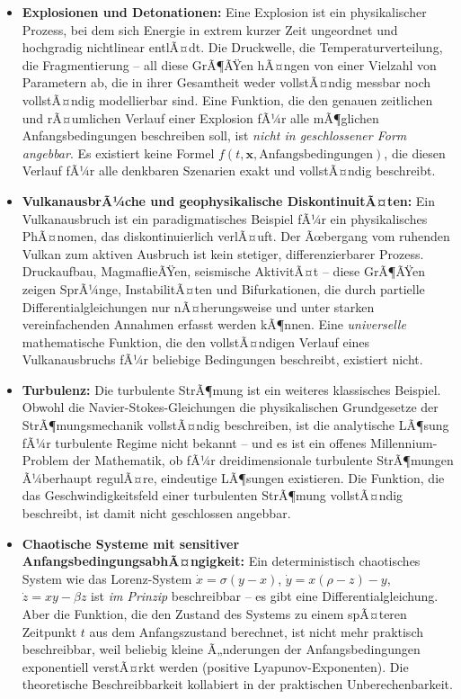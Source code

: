 ﻿\documentclass[12pt, a4paper]{article}
\begin{document}
	\begin{itemize}
		\item \textbf{Explosionen und Detonationen:} Eine Explosion ist ein physikalischer Prozess, bei dem sich Energie in extrem kurzer Zeit ungeordnet und hochgradig nichtlinear entlÃ¤dt. Die Druckwelle, die Temperaturverteilung, die Fragmentierung -- all diese GrÃ¶ÃŸen hÃ¤ngen von einer Vielzahl von Parametern ab, die in ihrer Gesamtheit weder vollstÃ¤ndig messbar noch vollstÃ¤ndig modellierbar sind. Eine Funktion, die den genauen zeitlichen und rÃ¤umlichen Verlauf einer Explosion fÃ¼r alle mÃ¶glichen Anfangsbedingungen beschreiben soll, ist \textit{nicht in geschlossener Form angebbar}. Es existiert keine Formel $f(t, \mathbf{x}, \text{Anfangsbedingungen})$, die diesen Verlauf fÃ¼r alle denkbaren Szenarien exakt und vollstÃ¤ndig beschreibt.
		\item \textbf{VulkanausbrÃ¼che und geophysikalische DiskontinuitÃ¤ten:} Ein Vulkanausbruch ist ein paradigmatisches Beispiel fÃ¼r ein physikalisches PhÃ¤nomen, das diskontinuierlich verlÃ¤uft. Der Ãœbergang vom ruhenden Vulkan zum aktiven Ausbruch ist kein stetiger, differenzierbarer Prozess. Druckaufbau, MagmaflieÃŸen, seismische AktivitÃ¤t -- diese GrÃ¶ÃŸen zeigen SprÃ¼nge, InstabilitÃ¤ten und Bifurkationen, die durch partielle Differentialgleichungen nur nÃ¤herungsweise und unter starken vereinfachenden Annahmen erfasst werden kÃ¶nnen. Eine \textit{universelle} mathematische Funktion, die den vollstÃ¤ndigen Verlauf eines Vulkanausbruchs fÃ¼r beliebige Bedingungen beschreibt, existiert nicht.
		\item \textbf{Turbulenz:} Die turbulente StrÃ¶mung ist ein weiteres klassisches Beispiel. Obwohl die Navier-Stokes-Gleichungen die physikalischen Grundgesetze der StrÃ¶mungsmechanik vollstÃ¤ndig beschreiben, ist die analytische LÃ¶sung fÃ¼r turbulente Regime nicht bekannt -- und es ist ein offenes Millennium-Problem der Mathematik, ob fÃ¼r dreidimensionale turbulente StrÃ¶mungen Ã¼berhaupt regulÃ¤re, eindeutige LÃ¶sungen existieren. Die Funktion, die das Geschwindigkeitsfeld einer turbulenten StrÃ¶mung vollstÃ¤ndig beschreibt, ist damit nicht geschlossen angebbar.
		\item \textbf{Chaotische Systeme mit sensitiver AnfangsbedingungsabhÃ¤ngigkeit:} Ein deterministisch chaotisches System wie das Lorenz-System $\dot{x} = \sigma(y-x)$, $\dot{y} = x(\rho - z) - y$, $\dot{z} = xy - \beta z$ ist \textit{im Prinzip} beschreibbar -- es gibt eine Differentialgleichung. Aber die Funktion, die den Zustand des Systems zu einem spÃ¤teren Zeitpunkt $t$ aus dem Anfangszustand berechnet, ist nicht mehr praktisch beschreibbar, weil beliebig kleine Ã„nderungen der Anfangsbedingungen exponentiell verstÃ¤rkt werden (positive Lyapunov-Exponenten). Die theoretische Beschreibbarkeit kollabiert in der praktischen Unberechenbarkeit.
	\end{itemize}
\end{document}
